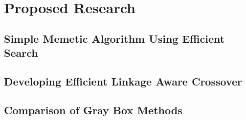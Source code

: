 \chapter{Proposed Research}

\section{Simple Memetic Algorithm Using Efficient Search}

\section{Developing Efficient Linkage Aware Crossover}

\section{Comparison of Gray Box Methods}

